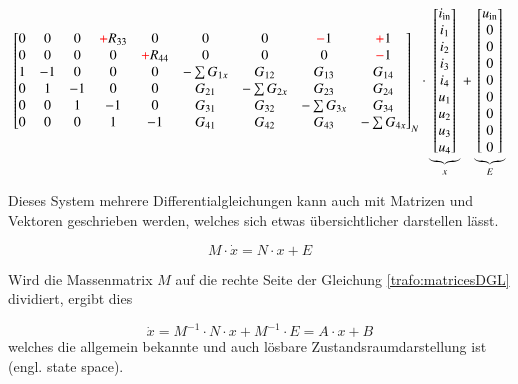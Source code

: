 \begin{refsection}
{\begin{align}
{\begin{bmatrix}
			0&0&0&\color{red}+\color{black}R_{33}&0 & 0&0&\color{red}-\color{black}1&\color{red}+\color{black}1 \\
			0&0&0&0&\color{red}+\color{black}R_{44} & 0&0&0&\color{red}-\color{black}1 \\
			1&-1&0&0&0 & -\sum G_{1x}&G_{12}&G_{13}&G_{14} \\
			0&1&-1&0&0 & G_{21} &- \sum G_{2x}& G_{23}& G_{24} \\
			0&0&1&-1&0 & G_{31} & G_{32} &-\sum G_{3x}&G_{34} \\
			0&0&0&1&-1 & G_{41}&G_{42}&G_{43}&-\sum G_{4x}
			\end{bmatrix}}_{\text{$N$}}
			\cdot
			\underbrace{\begin{bmatrix}
			i_\mathrm{in} \\
			i_1 \\
			i_2 \\
			i_3 \\
			i_4 \\
			u_1 \\
			u_2 \\
			u_3 \\
			u_4
			\end{bmatrix}}_{\text{$x$}}
			+
			\underbrace{\begin{bmatrix}
			u_\mathrm{in} \\
			0 \\
			0 \\
			0 \\
			0 \\
			0 \\
			0 \\
			0 \\
			0
			\end{bmatrix}}_{\text{$E$}}
			\label{trafo:symmetricalDGL}
\end{align}
}

Dieses System mehrere Differentialgleichungen kann auch mit Matrizen und Vektoren geschrieben werden, welches sich etwas übersichtlicher darstellen lässt. 

\begin{equation}
	M \cdot \dot x = N \cdot x + E
	\label{trafo:matricesDGL}
\end{equation}

Wird die Massenmatrix $M$ auf die rechte Seite der Gleichung \ref{trafo:matricesDGL} dividiert, ergibt dies

\begin{equation}
	\dot{x} = M^{-1} \cdot N \cdot x + M^{-1} \cdot E = A \cdot x + B
\end{equation}
welches die allgemein bekannte und auch lösbare Zustandsraumdarstellung  ist (engl. state space).


\end{refsection}
